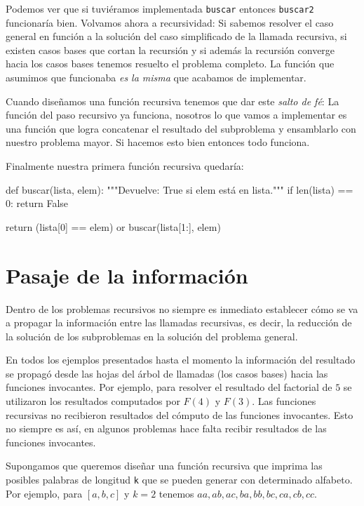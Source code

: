 Podemos ver que si tuviéramos implementada \lstinline!buscar! entonces
\lstinline!buscar2! funcionaría bien. Volvamos ahora a recursividad: Si sabemos
resolver el caso general en función a la solución del caso simplificado de la
llamada recursiva, si existen casos bases que cortan la recursión y si además
la recursión converge hacia los casos bases tenemos resuelto el problema
completo. La función que asumimos que funcionaba \emph{es la misma} que
acabamos de implementar.

Cuando diseñamos una función recursiva tenemos que dar este \emph{salto de fé}:
La función del paso recursivo ya funciona, nosotros lo que vamos a implementar
es una función que logra concatenar el resultado del subproblema y ensamblarlo con
nuestro problema mayor. Si hacemos esto bien entonces todo funciona.

Finalmente nuestra primera función recursiva quedaría:
\begin{codigo-python-sn}
def buscar(lista, elem):
   """Devuelve: True si elem está en lista."""
   if len(lista) == 0:
       return False

   return (lista[0] == elem) or buscar(lista[1:], elem)
\end{codigo-python-sn}

\section{Pasaje de la información}

Dentro de los problemas recursivos no siempre es inmediato establecer cómo
se va a propagar la información entre las llamadas recursivas, es decir, la
reducción de la solución de los subproblemas en la solución del problema
general.

En todos los ejemplos presentados hasta el momento la información del resultado
se propagó desde las hojas del árbol de llamadas (los casos bases) hacia las
funciones invocantes. Por ejemplo, para resolver el resultado del factorial
de $5$ se utilizaron los resultados computados por $F(4)$ y $F(3)$. Las funciones
recursivas no recibieron resultados del cómputo de las funciones invocantes.
Esto no siempre es así, en algunos problemas hace falta recibir resultados de
las funciones invocantes.

Supongamos que queremos diseñar una función recursiva que imprima las posibles
palabras de longitud \lstinline!k! que se pueden generar con determinado
alfabeto. Por ejemplo, para $[a, b, c]$ y $k=2$ tenemos $aa, ab, ac, ba, bb, bc, ca, cb, cc$.

